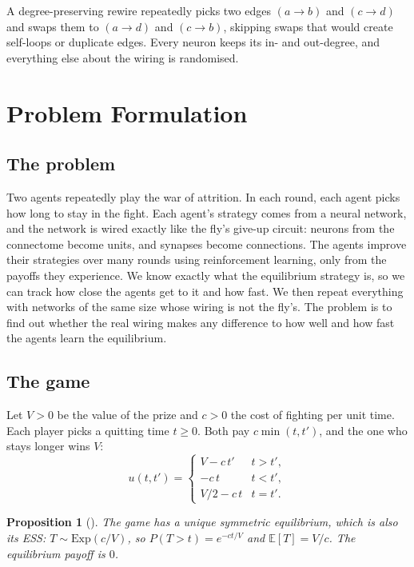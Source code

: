 \documentclass{article}
\newtheorem{proposition}{Proposition}
\newcommand{\E}{\mathbb{E}}
\begin{document}
A degree-preserving rewire \citep{maslov2002} repeatedly picks two edges $(a \to b)$ and $(c \to d)$ and swaps them to $(a\to d)$ and $(c \to b)$, skipping swaps that would create self-loops or duplicate edges. Every neuron keeps its in- and out-degree, and everything else about the wiring is randomised.

\section{Problem Formulation}
\label{sec:formulation}

\subsection{The problem}

Two agents repeatedly play the war of attrition. In each round, each agent picks how long to stay in the fight. Each agent's strategy comes from a neural network, and the network is wired exactly like the fly's give-up circuit: neurons from the connectome become units, and synapses become connections. The agents improve their strategies over many rounds using reinforcement learning, only from the payoffs they experience. We know exactly what the equilibrium strategy is, so we can track how close the agents get to it and how fast. We then repeat everything with networks of the same size whose wiring is not the fly's. The problem is to find out whether the real wiring makes any difference to how well and how fast the agents learn the equilibrium.

\subsection{The game}

Let $V > 0$ be the value of the prize and $c > 0$ the cost of fighting per unit time. Each player picks a quitting time $t \ge 0$. Both pay $c \min(t,t')$, and the one who stays longer wins $V$:
\[
u(t,t') =
\begin{cases}
V - c\,t' & t > t',\\
-c\,t & t < t',\\
V/2 - c\,t & t = t'.
\end{cases}
\]

\begin{proposition}[\citealp{maynardsmith1974, bishop1978}]
The game has a unique symmetric equilibrium, which is also its ESS: $T \sim \mathrm{Exp}(c/V)$, so $P(T > t) = e^{-ct/V}$ and $\E[T] = V/c$. The equilibrium payoff is $0$.
\end{proposition}
\end{document}
